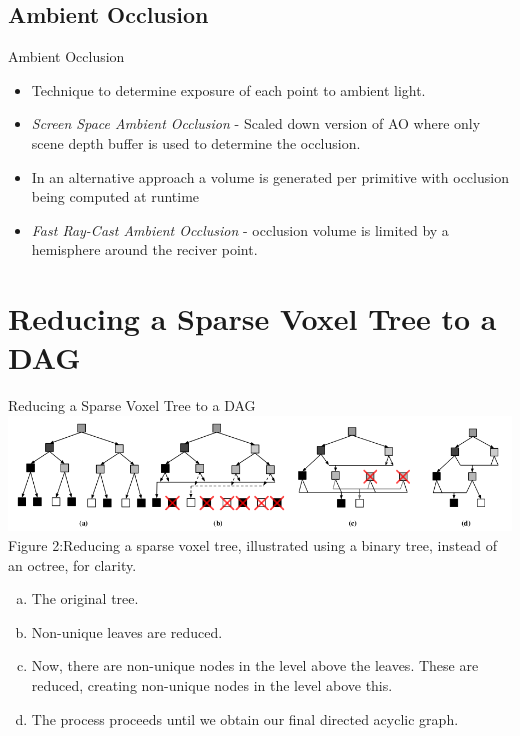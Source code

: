 \documentclass{beamer}
\begin{document}
\subsection{Ambient Occlusion}
\begin{frame}{Ambient Occlusion}
\begin{itemize}
	\item Technique to determine exposure of each point to ambient light.
	\item \textit{Screen Space Ambient Occlusion} - Scaled down version of AO where only scene depth buffer is used to determine the occlusion.
	\item In an alternative approach a volume is generated per primitive with occlusion being computed at runtime
	\item \textit{Fast Ray-Cast Ambient Occlusion} - occlusion volume is limited by a hemisphere around the reciver point.
\end{itemize}
\end{frame}

\section{Reducing a Sparse Voxel Tree to a DAG}
\begin{frame}{Reducing a Sparse Voxel Tree to a DAG}
	\includegraphics[scale=0.37]{fig2}{ Figure 2:Reducing a sparse voxel tree, illustrated using a binary tree, instead of an octree, for clarity.}
	\begin{enumerate}[a.]
		\item{The original tree.}
		\item{Non-unique leaves are reduced.}
		\item{Now, there are non-unique nodes in the level above the leaves. These are reduced, creating non-unique nodes in the level above this.}
		\item{The process proceeds until we obtain our final directed acyclic graph.}
	\end{enumerate}
\end{frame}
\end{document}
